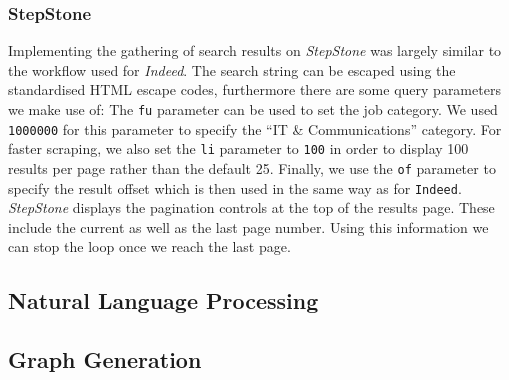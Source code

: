 \documentclass[runningheads]{llncs}
\begin{document}
\subsubsection{StepStone}
\label{subsub:stepstone}

Implementing the gathering of search results on \textit{StepStone} was largely similar to the workflow used for \textit{Indeed}. The search string can be escaped using the standardised HTML escape codes, furthermore there are some query parameters we make use of: The \texttt{fu} parameter can be used to set the job category. We used \texttt{1000000} for this parameter to specify the “IT \& Communications” category. For faster scraping, we also set the \texttt{li} parameter to \texttt{100} in order to display 100 results per page rather than the default 25. Finally, we use the \texttt{of} parameter to specify the result offset which is then used in the same way as for \texttt{Indeed}. \textit{StepStone} displays the pagination controls at the top of the results page. These include the current as well as the last page number. Using this information we can stop the loop once we reach the last page.

\subsection{Natural Language Processing}
\label{sub:natural_language_processing}


\subsection{Graph Generation}
\label{sub:graph_generation}
\end{document}

